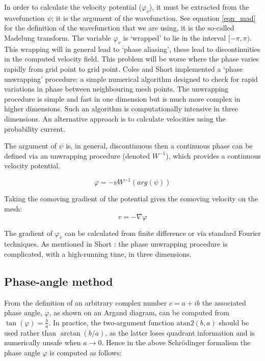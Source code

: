 In order to calculate the velocity potential ($\varphi_v$), it must be extracted from the wavefunction $\psi$; it is the argument of the wavefunction. See equation \ref{eqn_mad} for the definition of the wavefunction that we are using, it is the so-called Madelung transform. The variable $\varphi_v$ is `wrapped' to lie in the interval  $[-\pi,\pi)$. This wrapping will in general lead to `phase aliasing', these lead to discontinuities in the computed velocity field. This problem will be worse where the phase varies rapidly from grid point to grid point. Coles and Short \citep{bib_sho} implemented a `phase unwrapping' procedure: a simple numerical algorithm designed to check for rapid variations in phase between neighbouring mesh points. The unwrapping procedure is simple and fast in one dimension but is much more complex in higher dimensions. Such an algorithm is computationally intensive in three dimensions. An alternative approach is to calculate velocities using the probability current.

The argument of $\psi$ is, in general, discontinuous then a continuous phase can be defined via an unwrapping procedure (denoted $W^{-1}$), which provides a continuous velocity potential.

\begin{equation}
  \varphi = - \nu W^{-1}(arg(\psi))
\end{equation}

\noindent Taking the comoving gradient of the potential gives the comoving velocity on the mesh:
\begin{equation}
  v = - \nabla \varphi
\end{equation}

\noindent The gradient of $\varphi_v$ can be calculated from finite difference or via standard Fourier techniques. As mentioned in Short \citep{bib_short}: the phase unwrapping procedure is complicated, with a high-running time, in three dimensions.


\subsection{Phase-angle method}
From the definition of an arbitrary complex number $c = a+ i b$ the associated phase angle, $\varphi$, as shown on an Argand diagram, can be computed from $\tan(\varphi) = \frac{b}{a}$. In practice, the two-argument function $\mathrm{atan2}(b,a)$ should be used rather than $\arctan(b/a)$, as the latter loses quadrant information and is numerically unsafe when $a \to 0$. Hence in the above Schr\"odinger formalism the phase angle $\varphi$ is computed as follows:

